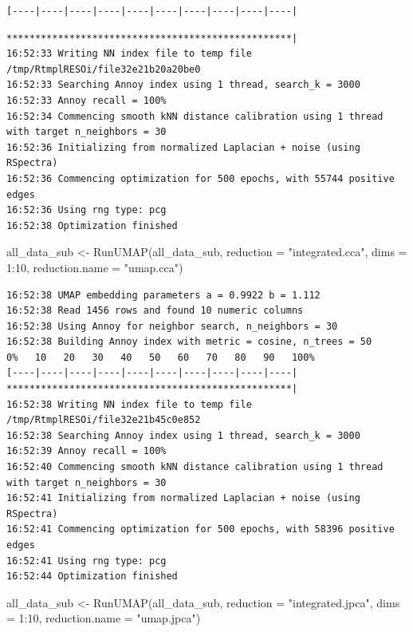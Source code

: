 \documentclass[
  letterpaper,
  DIV=11,
  numbers=noendperiod]{scrreprt}
\newenvironment{Shaded}{\begin{snugshade}}{\end{snugshade}}
\newcommand{\AttributeTok}[1]{\textcolor[rgb]{0.40,0.45,0.13}{#1}}
\newcommand{\DecValTok}[1]{\textcolor[rgb]{0.68,0.00,0.00}{#1}}
\newcommand{\FunctionTok}[1]{\textcolor[rgb]{0.28,0.35,0.67}{#1}}
\newcommand{\NormalTok}[1]{\textcolor[rgb]{0.00,0.23,0.31}{#1}}
\newcommand{\OtherTok}[1]{\textcolor[rgb]{0.00,0.23,0.31}{#1}}
\newcommand{\SpecialCharTok}[1]{\textcolor[rgb]{0.37,0.37,0.37}{#1}}
\newcommand{\StringTok}[1]{\textcolor[rgb]{0.13,0.47,0.30}{#1}}
\begin{document}
\begin{verbatim}
[----|----|----|----|----|----|----|----|----|----|
\end{verbatim}

\begin{verbatim}
**************************************************|
16:52:33 Writing NN index file to temp file /tmp/RtmplRESOi/file32e21b20a20be0
16:52:33 Searching Annoy index using 1 thread, search_k = 3000
16:52:33 Annoy recall = 100%
16:52:34 Commencing smooth kNN distance calibration using 1 thread with target n_neighbors = 30
16:52:36 Initializing from normalized Laplacian + noise (using RSpectra)
16:52:36 Commencing optimization for 500 epochs, with 55744 positive edges
16:52:36 Using rng type: pcg
16:52:38 Optimization finished
\end{verbatim}

\begin{Shaded}
\begin{Highlighting}[]
\NormalTok{all\_data\_sub }\OtherTok{\textless{}{-}} \FunctionTok{RunUMAP}\NormalTok{(all\_data\_sub, }\AttributeTok{reduction =} \StringTok{"integrated.cca"}\NormalTok{, }\AttributeTok{dims =} \DecValTok{1}\SpecialCharTok{:}\DecValTok{10}\NormalTok{, }\AttributeTok{reduction.name =} \StringTok{"umap.cca"}\NormalTok{)}
\end{Highlighting}
\end{Shaded}

\begin{verbatim}
16:52:38 UMAP embedding parameters a = 0.9922 b = 1.112
16:52:38 Read 1456 rows and found 10 numeric columns
16:52:38 Using Annoy for neighbor search, n_neighbors = 30
16:52:38 Building Annoy index with metric = cosine, n_trees = 50
0%   10   20   30   40   50   60   70   80   90   100%
[----|----|----|----|----|----|----|----|----|----|
**************************************************|
16:52:38 Writing NN index file to temp file /tmp/RtmplRESOi/file32e21b45c0e852
16:52:38 Searching Annoy index using 1 thread, search_k = 3000
16:52:39 Annoy recall = 100%
16:52:40 Commencing smooth kNN distance calibration using 1 thread with target n_neighbors = 30
16:52:41 Initializing from normalized Laplacian + noise (using RSpectra)
16:52:41 Commencing optimization for 500 epochs, with 58396 positive edges
16:52:41 Using rng type: pcg
16:52:44 Optimization finished
\end{verbatim}

\begin{Shaded}
\begin{Highlighting}[]
\NormalTok{all\_data\_sub }\OtherTok{\textless{}{-}} \FunctionTok{RunUMAP}\NormalTok{(all\_data\_sub, }\AttributeTok{reduction =} \StringTok{"integrated.jpca"}\NormalTok{, }\AttributeTok{dims =} \DecValTok{1}\SpecialCharTok{:}\DecValTok{10}\NormalTok{, }\AttributeTok{reduction.name =} \StringTok{"umap.jpca"}\NormalTok{)}
\end{Highlighting}
\end{Shaded}
\end{document}
